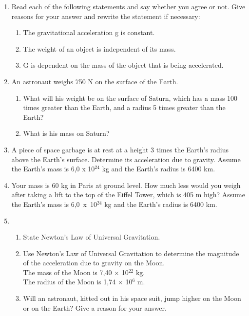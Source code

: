 \begin{enumerate}
\item {Read each of the following statements and say whether you agree or not. Give reasons for your answer and rewrite the statement if necessary:
\begin{enumerate}
\item The gravitational acceleration g is constant.
\item The weight of an object is independent of its mass.
\item G is dependent on the mass of the object that is being accelerated.
\end{enumerate}}

\item {An astronaut weighs 750 N on the surface of the Earth.
\begin{enumerate}
\item What will his weight be on the surface of Saturn, which has a mass 100 times greater than the Earth, and a radius 5 times greater than the Earth?
\item What is his mass on Saturn?
\end{enumerate}
}

\item {A piece of space garbage is at rest at a height 3 times the Earth's radius above the Earth's surface.  Determine its acceleration due to gravity. Assume the Earth's mass is 6,0 x 10$^{24}$ kg and the Earth's radius is 6400 km.}

\item {Your mass is 60 kg in Paris at ground level.  How much less would you weigh after taking a lift to the top of the Eiffel Tower, which is 405 m high? Assume the Earth's mass is 6,0~x~10$^{24}$ kg and the Earth's radius is 6400 km.}

\item { \begin{enumerate}
	\item{State Newton's Law of Universal Gravitation.}
	\item{Use Newton's Law of Universal Gravitation to determine the magnitude of the acceleration due to 	gravity on the Moon.\\
The mass of the Moon is 7,40 $\times$ 10$^{22}$ kg.\\
The radius of the Moon is 1,74 $\times$ 10$^6$ m.\\}
	\item{Will an astronaut, kitted out in his space suit, jump higher on the Moon or on the Earth? Give a reason for your answer.
}
\end{enumerate}
}

\end{enumerate}


